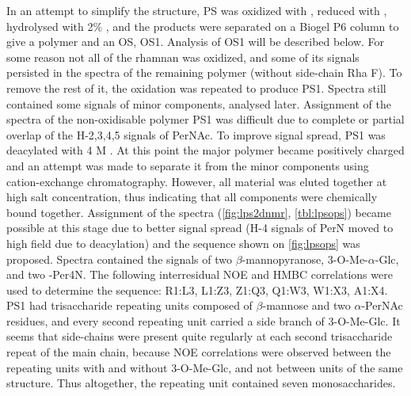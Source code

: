 		In an attempt to simplify the structure, \ac{PS} was oxidized with , reduced with , hydrolysed with 2\% , and the products were separated on a Biogel P6 column to give a polymer and an \ac{OS}, \ac{OS}1. Analysis of \ac{OS}1 will be described below. For some reason not all of the rhamnan was oxidized, and some of its signals persisted in the spectra of the remaining polymer (without side-chain Rha F). To remove the rest of it, the oxidation was repeated to produce \ac{PS}1. Spectra still contained some signals of minor components, analysed later. Assignment of the spectra of the non-oxidisable polymer \ac{PS}1 was difficult due to complete or partial overlap of the H-2,3,4,5 signals of PerNAc. To improve signal spread, \ac{PS}1 was deacylated with 4 M . At this point the major polymer became positively charged and an attempt was made to separate it from the minor components using cation-exchange chromatography. However, all material was eluted together at high salt concentration, thus indicating that all components were chemically bound together. Assignment of the spectra (\cref{fig:lps2dnmr}, \cref{tbl:lpsops}) became possible at this stage due to better signal spread (H-4 signals of PerN moved to high field due to deacylation) and the sequence shown on \cref{fig:lpsops} was proposed. Spectra contained the signals of two $\beta$-mannopyranose, 3-O-Me-$\alpha$-Glc, and two -Per4N. The following interresidual \ac{NOE} and \ac{HMBC} correlations were used to determine the sequence: R1:L3, L1:Z3, Z1:Q3, Q1:W3, W1:X3, A1:X4. \Ac{PS}1 had trisaccharide repeating units composed of $\beta$-mannose and two $\alpha$-PerNAc residues, and every second repeating unit carried a side branch of 3-O-Me-Glc. It seems that side-chains were present quite regularly at each second trisaccharide repeat of the main chain, because \ac{NOE} correlations were observed between the repeating units with and without 3-O-Me-Glc, and not between units of the same structure. Thus altogether, the repeating unit contained seven monosaccharides.

